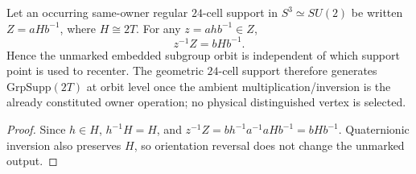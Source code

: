 \documentclass[12pt,a4paper]{article}
\begin{document}
\begin{lemma}
\label{p2a:lem:v236-optimal24-recentering}
Let an occurring same-owner regular \(24\)-cell support in
\(S^3\simeq SU(2)\) be written \(Z=aHb^{-1}\), where \(H\cong2T\).  For any
\(z=ahb^{-1}\in Z\),
\[
 z^{-1}Z=bH b^{-1}.
\]
Hence the unmarked embedded subgroup orbit is independent of which support
point is used to recenter.  The geometric \(24\)-cell support therefore
generates \(\mathrm{GrpSupp}(2T)\) at orbit level once the ambient
multiplication/inversion is the already constituted owner operation; no
physical distinguished vertex is selected.
\end{lemma}
\begin{proof}
Since \(h\in H\), \(h^{-1}H=H\), and
\(z^{-1}Z=bh^{-1}a^{-1}aHb^{-1}=bHb^{-1}\).  Quaternionic inversion also
preserves \(H\), so orientation reversal does not change the unmarked output.
\end{proof}
\end{document}
